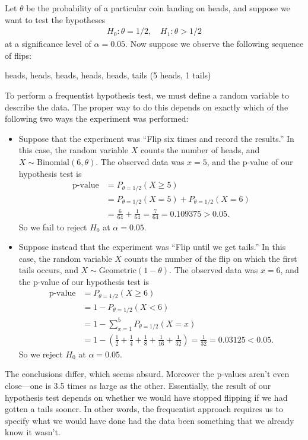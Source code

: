 \begin{example}
  Let $\theta$ be the probability of a particular coin landing on heads, and suppose we want to test the hypotheses
  \begin{align}
    H_0: \theta = 1/2, \quad H_1: \theta > 1/2
  \end{align}
  at a significance level of $\alpha = 0.05$. Now suppose we observe the following sequence of flips:
  \begin{center}
    heads, heads, heads, heads, heads, tails \quad (5 heads, 1 tails)
  \end{center}
  
  To perform a frequentist hypothesis test, we must define a random variable to describe the data. The proper way to do this depends on exactly which of the following two ways the experiment was performed:
  
  \begin{itemize}
    \item Suppose that the experiment was ``Flip six times and record the results.'' In this case, the random variable $X$ counts the number of heads, and $X \sim \text{Binomial}(6, \theta)$. The observed data was $x = 5$, and the p-value of our hypothesis test is
    \begin{align}
      \text{p-value} &= P_{\theta=1/2}(X \geq 5) \\
      &= P_{\theta=1/2}(X = 5) + P_{\theta=1/2}(X = 6) \\
      &= \frac{6}{64} + \frac{1}{64} = \frac{7}{64} = 0.109375 > 0.05.
    \end{align}
    So we fail to reject $H_0$ at $\alpha = 0.05$.
    
    \item Suppose instead that the experiment was ``Flip until we get tails.'' In this case, the random variable $X$ counts the number of the flip on which the first tails occurs, and $X \sim \text{Geometric}(1 - \theta)$. The observed data was $x = 6$, and the p-value of our hypothesis test is
    \begin{align}
      \text{p-value} &= P_{\theta=1/2}(X \geq 6) \\
      &= 1 - P_{\theta=1/2}(X < 6) \\
      &= 1 - \sum_{x=1}^{5} P_{\theta=1/2}(X = x) \\
      &= 1 - \left(\frac{1}{2} + \frac{1}{4} + \frac{1}{8} + \frac{1}{16} + \frac{1}{32}\right) = \frac{1}{32} = 0.03125 < 0.05.
    \end{align}
    So we reject $H_0$ at $\alpha = 0.05$.
  \end{itemize}
  
  The conclusions differ, which seems absurd. Moreover the p-values aren't even close---one is 3.5 times as large as the other. Essentially, the result of our hypothesis test depends on whether we would have stopped flipping if we had gotten a tails sooner. In other words, the frequentist approach requires us to specify what we would have done had the data been something that we already know it wasn't. 
\end{example}

